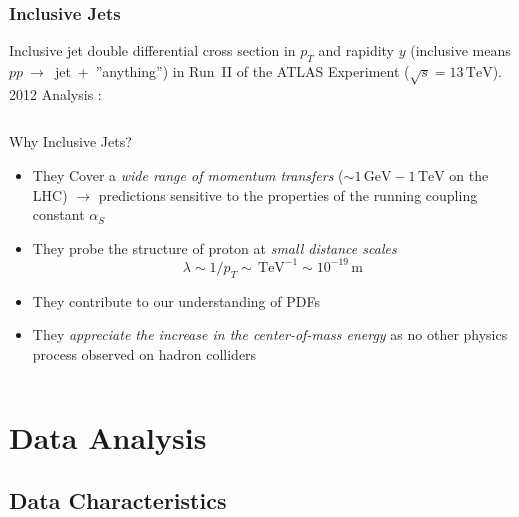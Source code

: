 \documentclass[compress]{beamer}
\newcommand{\GeV}{\,\text{GeV}}
\newcommand{\TeV}{\,\text{TeV}}
\newcommand{\pt}{p_{T}}
\begin{document}
\begin{frame}
\frametitle{Inclusive Jets} 
\scriptsize
Inclusive jet double differential cross section in $\pt$ and rapidity
$y$ (inclusive means $pp~\rightarrow$~jet~+~''anything'') in Run~II of the ATLAS
Experiment ($\sqrt{s}=13\TeV$).
2012 Analysis {}:
\begin{columns}[onlytextwidth]
  \begin{column}{0.5\textwidth}
    \begin{figure}[b]
      \centering
      \texttt{[image: \{../PrezentationATLASmeeting/ATLASinclusive04]}.png}
    \end{figure}
  \end{column}
  \begin{column}{0.5\textwidth}
    \begin{block}{Why Inclusive Jets?}
      \begin{itemize}
        \item They Cover a \textit{\color{red}wide range of momentum transfers}
          ($\sim 1 \GeV - 1 \TeV$ on the LHC) $\rightarrow$ predictions sensitive to
          the properties of the running coupling constant $\alpha_S$
        \item They probe the structure of proton at \textit{\color{red}small
        distance scales}
        \begin{equation*}
          \lambda \sim 1/\pt \sim \TeV^{-1} \sim 10^{-19}\,\text{m}
        \end{equation*}
        \item They contribute to our understanding of PDFs
        \item They \textit{\color{red}appreciate the increase in the center-of-mass
        energy} as no other physics process observed on hadron colliders
      \end{itemize}
    \end{block}
  \end{column}
\end{columns}
\end{frame}


\section{Data Analysis}
\subsection{Data Characteristics}
\end{document}
